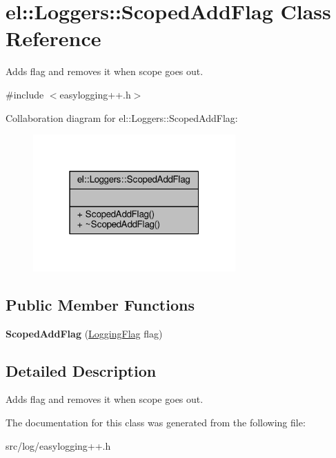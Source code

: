 \hypertarget{classel_1_1Loggers_1_1ScopedAddFlag}{}\section{el\+:\+:Loggers\+:\+:Scoped\+Add\+Flag Class Reference}
\label{classel_1_1Loggers_1_1ScopedAddFlag}


Adds flag and removes it when scope goes out.  




{\ttfamily \#include $<$easylogging++.\+h$>$}



Collaboration diagram for el\+:\+:Loggers\+:\+:Scoped\+Add\+Flag\+:
\nopagebreak
\begin{figure}[H]
\begin{center}
\leavevmode
\includegraphics[width=220pt]{d9/d56/classel_1_1Loggers_1_1ScopedAddFlag__coll__graph}
\end{center}
\end{figure}
\subsection*{Public Member Functions}
\begin{DoxyCompactItemize}
\item 
{\bfseries Scoped\+Add\+Flag} (\hyperlink{namespaceel_a2784aacd04cb7816ac1c0b20fcbf83cb}{Logging\+Flag} flag)\hypertarget{classel_1_1Loggers_1_1ScopedAddFlag_a13e0b1052cd1a7a15fae63fd6454d598}{}\label{classel_1_1Loggers_1_1ScopedAddFlag_a13e0b1052cd1a7a15fae63fd6454d598}

\end{DoxyCompactItemize}


\subsection{Detailed Description}
Adds flag and removes it when scope goes out. 

The documentation for this class was generated from the following file\+:\begin{DoxyCompactItemize}
\item 
src/log/easylogging++.\+h\end{DoxyCompactItemize}
